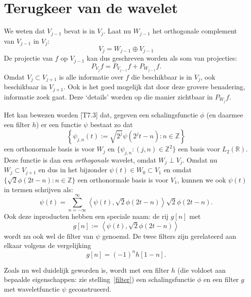 \documentclass[11pt]{report}
\newcommand{\R}{\mathbb{R}}
\newcommand{\Z}{\mathbb{Z}}
\theoremstyle{plain}
\theoremstyle{remark}
\begin{document}
\section{Terugkeer van de wavelet}
We weten dat $V_{j-1}$ bevat is in $V_{j}$. Laat nu $W_{j-1}$ het orthogonale complement van $V_{j-1}$ in $V_{j}$:
\begin{equation}
\label{ruimterec}
	V_{j} = W_{j-1} \oplus V_{j-1} 
\end{equation}
De projectie van $f$ op $V_{j-1}$ kan dus geschreven worden als som van projecties:
\begin{equation}
\label{projectie_rec}
	P_{V_{j}} f = P_{V_{j-1}} f + P_{W_{j-1}} f.
\end{equation}
Omdat $V_j \subset V_{j+1}$ is alle informatie over $f$ die beschikbaar is in $V_j$, ook beschikbaar in $V_{j+1}$. Ook is het goed mogelijk dat door deze grovere benadering, informatie zoek gaat. Deze `details' worden op die manier zichtbaar in $P_{W_j} f$.

Het kan bewezen worden \cite{mallat}[T7.3] dat, gegeven een schalingsfunctie $\phi$ (en daarmee een filter $h$) er een functie $\psi$ bestaat zo dat 
\[
	\left\{ \psi_{j,n}(t) := \sqrt{2^j} \psi\left(2^jt - n\right) : n \in \Z \right\}
\] een orthonormale basis is voor $W_j$ en $\{ \psi_{j,n}: (j,n) \in \Z^2 \}$ een basis voor $L_2(\R)$. Deze functie is dan een \emph{orthogonale} wavelet, omdat $W_j \perp V_j$.
Omdat nu $W_j \subset V_{j+1}$ en dus in het bijzonder $\psi(t) \in W_0 \subset V_1$ en omdat $\{ \sqrt{2}\phi(2t-n): n \in \Z \}$ een orthonormale basis is voor $V_1$, kunnen we ook $\psi(t)$ in termen schrijven als:
\[
	\psi\left(t\right) = \sum_{n=-\infty}^{\infty} \left\langle \psi\left(t\right), \sqrt{2}\phi(2t-n) \right\rangle \sqrt{2}\phi(2t-n).
\]
Ook deze inproducten hebben een speciale naam: de rij $g[n]$ met
\[
	g[n] := \left\langle \psi\left(t\right), \sqrt{2}\phi(2t-n) \right\rangle 
\]
wordt nu ook wel de filter van $\psi$ genoemd. De twee filters zijn gerelateerd aan elkaar volgens de vergelijking\cite{wavelet_filter[V13]}\cite{daubechies[P958]}
\[
	g[n] = (-1)^{n}h[1-n].
\]

Zoals nu wel duidelijk geworden is, wordt met een filter $h$ (die voldoet aan bepaalde eigenschappen: zie stelling~\ref{filter}) een schalingsfunctie $\phi$ en een filter $g$ met waveletfunctie $\psi$ geconstrueerd.
\end{document}
